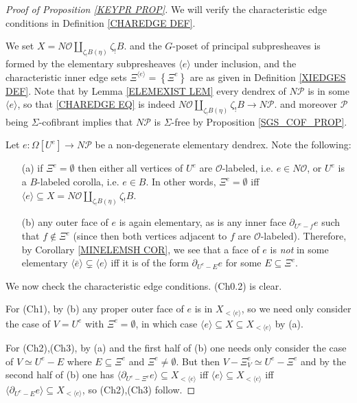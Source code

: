 \documentclass[a4paper,10pt
,draft
]{article}%
\numberwithin{equation}{section}
\numberwithin{figure}{section}
\theoremstyle{definition} %
\renewcommand{\O}{\ensuremath{\mathcal O}}
\renewcommand{\P}{\ensuremath{\mathcal P}}
\newcommand{\1}{\ensuremath{\mathbbm 1}}%
\begin{document}
\begin{proof}[Proof of Proposition \ref{KEYPR PROP}]
	
	We will verify the characteristic edge conditions in Definition \ref{CHAREDGE DEF}.
	
	We set $X = N \mathcal{O} \amalg_{\zeta_!B (\eta)} \zeta_!B$.  %
	and the $G$-poset of principal subpresheaves is formed by the 
	elementary subpresheaves 
	$\langle e \rangle$
	under inclusion, and the characteristic inner edge sets
	$\Xi^{\langle e \rangle} = \left\{\Xi^{e}\right\}$ are as given in Definition \ref{XIEDGES DEF}.
	Note that by Lemma \ref{ELEMEXIST LEM}
	every dendrex of $N \mathcal{P}$ is in some 
	$\langle e \rangle$, so that
	\eqref{CHAREDGE EQ} is indeed
	$N \mathcal{O} \amalg_{\zeta_!B (\eta)} \zeta_!B \to N \mathcal{P}$.
	and moreover $\P$ being $\Sigma$-cofibrant implies that $N \mathcal P$ is $\Sigma$-free by Proposition \ref{SGS_COF_PROP}.
	
	
	
	Let $e\colon \Omega[U^e] \to N \mathcal{P}$
	be a non-degenerate elementary dendrex. Note the following: 
	\begin{itemize}
		\item[(a)] if $\Xi^e = \emptyset$ then 
		either all vertices of $U^e$ are $\O$-labeled, i.e. $e \in N \mathcal{O}$, or $U^e$ is a $B$-labeled corolla, i.e. $e \in B$.
		In other words, $\Xi^e = \emptyset$ iff 
		$\langle e \rangle \subseteq X = N \mathcal{O} \amalg_{\zeta_!B (\eta)} \zeta_!B$.
		\item[(b)] any outer face of $e$ is again elementary,
		as is any inner face $\partial_{U^e-f} e$ such that $f \not \in \Xi^e$
		(since then both vertices adjacent to $f$ are $\O$-labeled).
		Therefore, by Corollary \ref{MINELEMSH COR},
		we see that a face of $e$ is \emph{not} in
		some elementary $\langle \bar{e} \rangle \subsetneq \langle e \rangle$
		iff it is of the form
		$\partial_{U^e - E} e$
		for some $E \subseteq \Xi^e$.
	\end{itemize}
	
	
	We now check the characteristic edge conditions. (Ch0.2) is clear.
	
	For (Ch1), by (b) any proper outer face of $e$ is in $X_{<\langle e\rangle}$, so we need only consider the case of
	$V=U^e$ with $\Xi^e=\emptyset$, in which case
	$\langle e \rangle \subseteq X \subseteq X_{<\langle e\rangle}$ by (a).
	
	For (Ch2),(Ch3), by (a) and the first half of (b) one needs only consider the case of
	$V \simeq U^e - E$ where $E \subseteq \Xi^e$ and $\Xi^e \neq \emptyset$.
	But then
	$V - \Xi^e_V \simeq U^e- \Xi^e$
	and by the second half of (b)
	one has
	$\langle \partial_{U^e-\Xi^e}e \rangle \subseteq  X_{<\langle e\rangle}$
	iff
	$\langle e \rangle \subseteq  X_{<\langle e\rangle}$
	iff
	$\langle \partial_{U^e-E}e \rangle \subseteq  X_{<\langle e\rangle}$,
	so (Ch2),(Ch3) follow.
	

\end{proof}
\end{document}
